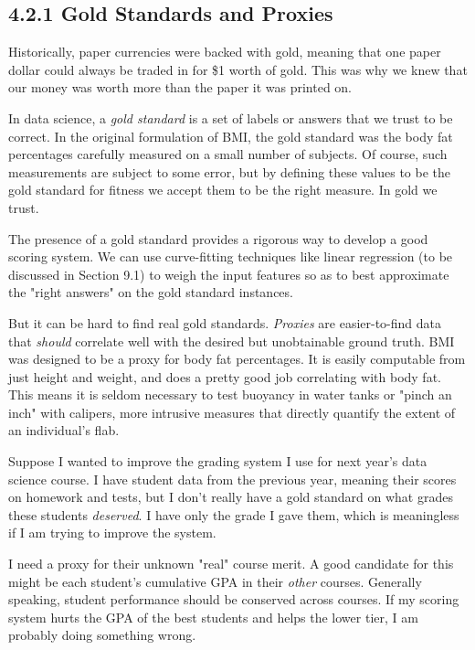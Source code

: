 \documentclass[10pt]{article}
\begin{document}
\subsection*{4.2.1 Gold Standards and Proxies}
Historically, paper currencies were backed with gold, meaning that one paper dollar could always be traded in for \$1 worth of gold. This was why we knew that our money was worth more than the paper it was printed on.

In data science, a \textit{gold standard} is a set of labels or answers that we trust to be correct. In the original formulation of BMI, the gold standard was the body fat percentages carefully measured on a small number of subjects. Of course, such measurements are subject to some error, but by defining these values to be the gold standard for fitness we accept them to be the right measure. In gold we trust.

The presence of a gold standard provides a rigorous way to develop a good scoring system. We can use curve-fitting techniques like linear regression (to be discussed in Section 9.1) to weigh the input features so as to best approximate the "right answers" on the gold standard instances.

But it can be hard to find real gold standards. \textit{Proxies} are easier-to-find data that \textit{should} correlate well with the desired but unobtainable ground truth. BMI was designed to be a proxy for body fat percentages. It is easily computable from just height and weight, and does a pretty good job correlating with body fat. This means it is seldom necessary to test buoyancy in water tanks or "pinch an inch" with calipers, more intrusive measures that directly quantify the extent of an individual's flab.

Suppose I wanted to improve the grading system I use for next year's data science course. I have student data from the previous year, meaning their scores on homework and tests, but I don't really have a gold standard on what grades these students \textit{deserved}. I have only the grade I gave them, which is meaningless if I am trying to improve the system.

I need a proxy for their unknown "real" course merit. A good candidate for this might be each student's cumulative GPA in their \textit{other} courses. Generally speaking, student performance should be conserved across courses. If my scoring system hurts the GPA of the best students and helps the lower tier, I am probably doing something wrong.
\end{document}
